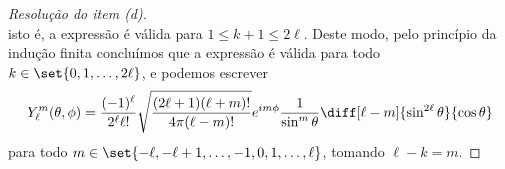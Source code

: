 \begin{proof}[Resolução do item (d)]
\begin{equation*}
    \end{equation*}
    isto é, a expressão é válida para \(1 \leq k + 1 \leq 2\ell\). Deste modo, pelo princípio da indução finita concluímos que a expressão é válida para todo \(k \in \set{0, 1,\dots, 2\ell}\), e podemos escrever
    \begin{equation*}
        Y_\ell^m(\theta, \phi) = \frac{(-1)^\ell}{2^{\ell}\ell!}\sqrt{\frac{(2\ell + 1)(\ell + m)!}{4\pi(\ell - m)!}}e^{im\phi} \frac{1}{\sin^m\theta}\diff[\ell - m]{\sin^{2\ell}\theta}{\cos\theta}
    \end{equation*}
    para todo \(m \in \set{-\ell, -\ell + 1, \dots, -1, 0,1,\dots,\ell}\), tomando \(\ell - k = m\).
\end{proof}
